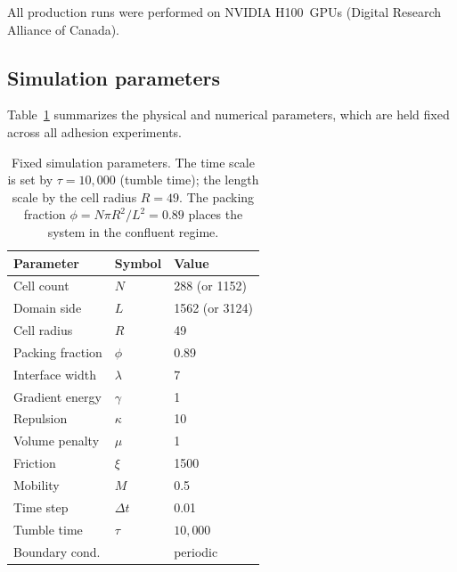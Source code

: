 \documentclass[aps,pre,twocolumn,superscriptaddress,longbibliography,floatfix]{revtex4-2}
\begin{document}
All production runs were performed on NVIDIA H100~GPUs (Digital Research
Alliance of Canada).

\subsection{Simulation parameters}
\label{sec:methods:params}

Table~\ref{tab:params} summarizes the physical and numerical parameters,
which are held fixed across all adhesion experiments.

\begin{table}[b]
  \caption{%
    Fixed simulation parameters.  The time scale is set by $\tau = 10{,}000$
    (tumble time); the length scale by the cell radius $R = 49$.  The packing
    fraction $\phi = N \pi R^2 / L^2 = 0.89$ places the system in the
    confluent regime.
  }
  \label{tab:params}
  \begin{ruledtabular}
  \begin{tabular}{lll}
    Parameter & Symbol & Value \\ \hline
    Cell count       & $N$        & 288 (or 1152)     \\
    Domain side      & $L$        & 1562 (or 3124)    \\
    Cell radius      & $R$        & 49                \\
    Packing fraction & $\phi$     & 0.89              \\
    Interface width  & $\lambda$  & 7                 \\
    Gradient energy  & $\gamma$   & 1                 \\
    Repulsion        & $\kappa$   & 10                \\
    Volume penalty   & $\mu$      & 1                 \\
    Friction         & $\xi$      & 1500              \\
    Mobility         & $M$        & 0.5               \\
    Time step        & $\Delta t$ & 0.01              \\
    Tumble time      & $\tau$     & $10{,}000$        \\
    Boundary cond.   &            & periodic          \\
  \end{tabular}
  \end{ruledtabular}
\end{table}
\end{document}

